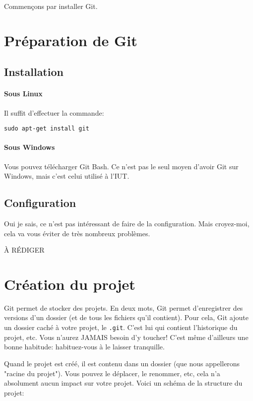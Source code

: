 \documentclass[10pt,a4paper]{article}
\begin{document}
Commençons par installer Git.

\section{Préparation de Git}

\subsection{Installation}

\paragraph{Sous Linux}

Il suffit d'effectuer la commande:

\begin{verbatim}
sudo apt-get install git
\end{verbatim}

\paragraph{Sous Windows}

Vous pouvez télécharger Git Bash. Ce n'est pas le seul moyen d'avoir Git sur Windows, mais c'est celui utilisé à l'IUT.

\subsection{Configuration\label{config}}

Oui je sais, ce n'est pas intéressant de faire de la configuration. Mais croyez-moi, cela va vous éviter de très nombreux problèmes.

À RÉDIGER

\section{Création du projet}

Git permet de stocker des projets. En deux mots, Git permet d'enregistrer des versions d'un dossier (et de tous les fichiers qu'il contient). Pour cela, Git ajoute un dossier caché à votre projet, le {\tt .git}. C'est lui qui contient l'historique du projet, etc. Vous n'aurez JAMAIS besoin d'y toucher! C'est même d'ailleurs une bonne habitude: habituez-vous à le laisser tranquille.

Quand le projet est créé, il est contenu dans un dossier (que nous appellerons "racine du projet"). Vous pouvez le déplacer, le renommer, etc, cela n'a absolument aucun impact sur votre projet. Voici un schéma de la structure du projet:
\end{document}
